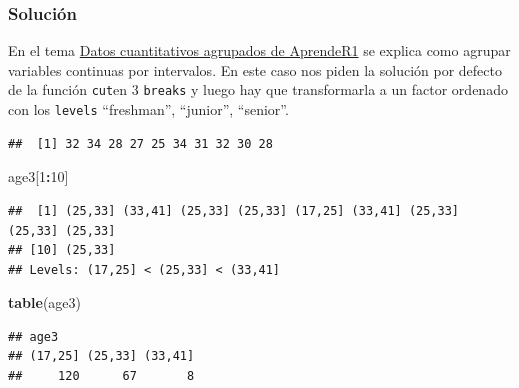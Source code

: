 \documentclass[]{article}
\newenvironment{Shaded}{\begin{snugshade}}{\end{snugshade}}
\newcommand{\CommentTok}[1]{\textcolor[rgb]{0.56,0.35,0.01}{\textit{#1}}}
\newcommand{\DataTypeTok}[1]{\textcolor[rgb]{0.13,0.29,0.53}{#1}}
\newcommand{\DecValTok}[1]{\textcolor[rgb]{0.00,0.00,0.81}{#1}}
\newcommand{\KeywordTok}[1]{\textcolor[rgb]{0.13,0.29,0.53}{\textbf{#1}}}
\newcommand{\NormalTok}[1]{#1}
\newcommand{\OperatorTok}[1]{\textcolor[rgb]{0.81,0.36,0.00}{\textbf{#1}}}
\begin{document}
\hypertarget{soluciuxf3n-3}{%
\subsubsection{Solución}\label{soluciuxf3n-3}}

En el tema
\href{https://aprender-uib.github.io/AprendeR1/chap-hist.html}{Datos
cuantitativos agrupados de AprendeR1} se explica como agrupar variables
continuas por intervalos. En este caso nos piden la solución por defecto
de la función \texttt{cut}en 3 \texttt{breaks} y luego hay que
transformarla a un factor ordenado con los \texttt{levels} ``freshman'',
``junior'', ``senior''.

\begin{Shaded}
\end{Shaded}

\begin{verbatim}
##  [1] 32 34 28 27 25 34 31 32 30 28
\end{verbatim}

\begin{Shaded}
\begin{Highlighting}[]
\NormalTok{age3[}\DecValTok{1}\OperatorTok{:}\DecValTok{10}\NormalTok{]}
\end{Highlighting}
\end{Shaded}

\begin{verbatim}
##  [1] (25,33] (33,41] (25,33] (25,33] (17,25] (33,41] (25,33] (25,33] (25,33]
## [10] (25,33]
## Levels: (17,25] < (25,33] < (33,41]
\end{verbatim}

\begin{Shaded}
\begin{Highlighting}[]
\KeywordTok{table}\NormalTok{(age3)}
\end{Highlighting}
\end{Shaded}

\begin{verbatim}
## age3
## (17,25] (25,33] (33,41] 
##     120      67       8
\end{verbatim}
\end{document}
